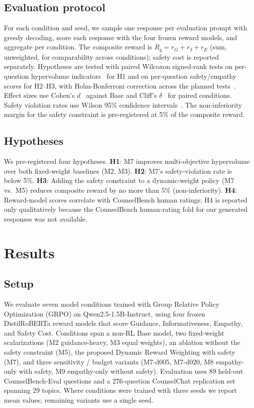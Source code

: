 \documentclass[10pt,twocolumn]{article}
\begin{document}
\subsection{Evaluation protocol}

For each condition and seed, we sample one response per evaluation prompt with greedy decoding, score each response with the four frozen reward models, and aggregate per condition. The composite reward is $R_q = r_G + r_I + r_E$ (sum, unweighted, for comparability across conditions); safety cost is reported separately. Hypotheses are tested with paired Wilcoxon signed-rank tests on per-question hypervolume indicators~\citep{zitzler1999hv} for H1 and on per-question safety/empathy scores for H2--H3, with Holm-Bonferroni correction across the planned tests~\citep{holm1979simple}. Effect sizes use Cohen's $d$~\citep{cohen1988statistical} against Base and Cliff's $\delta$~\citep{cliff1993dominance} for paired conditions. Safety violation rates use Wilson 95\% confidence intervals~\citep{wilson1927ci}. The non-inferiority margin for the safety constraint is pre-registered at 5\% of the composite reward.

\subsection{Hypotheses}

We pre-registered four hypotheses. \textbf{H1}: M7 improves multi-objective hypervolume over both fixed-weight baselines (M2, M3). \textbf{H2}: M7's safety-violation rate is below 5\%. \textbf{H3}: Adding the safety constraint to a dynamic-weight policy (M7 vs.\ M5) reduces composite reward by no more than 5\% (non-inferiority). \textbf{H4}: Reward-model scores correlate with CounselBench human ratings; H4 is reported only qualitatively because the CounselBench human-rating fold for our generated responses was not available.

\section{Results}
\label{sec:results}

\subsection*{Setup}

We evaluate seven model conditions trained with Group Relative Policy Optimization (GRPO) on Qwen2.5-1.5B-Instruct, using four frozen DistilRoBERTa reward models that score Guidance, Informativeness, Empathy, and Safety Cost. Conditions span a non-RL Base model, two fixed-weight scalarizations (M2 guidance-heavy, M3 equal weights), an ablation without the safety constraint (M5), the proposed Dynamic Reward Weighting with safety (M7), and three sensitivity / budget variants (M7-d005, M7-d020, M8 empathy-only with safety, M9 empathy-only without safety). Evaluation uses 89 held-out CounselBench-Eval questions and a 276-question CounselChat replication set spanning 29 topics. Where conditions were trained with three seeds we report mean values; remaining variants use a single seed.
\end{document}

